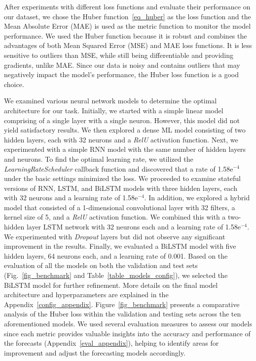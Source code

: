 After experiments with different loss functions and evaluate their performance on our dataset, we chose the Huber function~\ref{eq_huber} as the loss function and the Mean Absolute Error (MAE) is used as the metric function to monitor the model performance.
We used the Huber function because it is robust and combines the advantages of both Mean Squared Error (MSE) and MAE loss functions. It is less sensitive to outliers than MSE, while still being differentiable and providing gradients, unlike MAE. Since our data is noisy and contains outliers that may negatively impact the model's performance, the Huber loss function is a good choice.

We examined various neural network models to determine the optimal architecture for our task.
Initially, we started with a simple linear model comprising of a single layer with a single neuron. However, this model did not yield satisfactory results.
We then explored a dense ML model consisting of two hidden layers, each with 32 neurons and a \textit{RelU} activation function. Next, we experimented with a simple RNN model with the same number of hidden layers and neurons.
To find the optimal learning rate, we utilized the \textit{LearningRateScheduler} callback function and discovered that a rate of 1.58e$^{-4}$ under the basic settings minimized the loss.
We proceeded to examine stateful versions of RNN, LSTM, and BiLSTM models with three hidden layers, each with 32 neurons and a learning rate of 1.58e$^{-4}$.
In addition, we explored a hybrid model that consisted of a 1-dimensional convolutional layer with 32 filters, a kernel size of 5, and a \textit{RelU} activation function. We combined this with a two-hidden layer LSTM network with 32 neurons each and a learning rate of 1.58e$^{-4}$. We experimented with \textit{Dropout} layers but did not observe any significant improvement in the results.
Finally, we evaluated a BiLSTM model with five hidden layers, 64 neurons each, and a learning rate of 0.001.
Based on the evaluation of all the models on both the validation and test sets (Fig.~\ref{fig_benchmark} and Table~\ref{table_models_config}), we selected the BiLSTM model for further refinement. More details on the final model architecture and hyperparameters are explained in the Appendix~\ref{config_appendix}.
Figure~\ref{fig_benchmark} presents a comparative analysis of the Huber loss within the validation and testing sets across the ten aforementioned models.
We used several evaluation measures to assess our models since each metric provides valuable insights into the accuracy and performance of the forecasts (Appendix~\ref{eval_appendix}), helping to identify areas for improvement and adjust the forecasting models accordingly.

